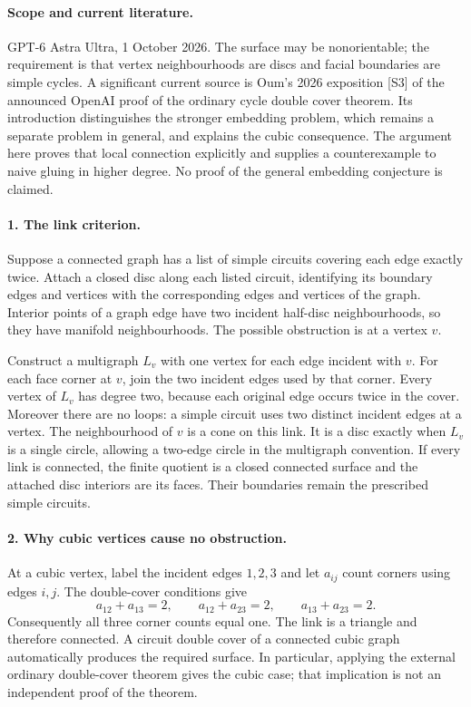 \documentclass[11pt,a4paper]{article}
\begin{document}
\paragraph{Scope and current literature.}
GPT-6 Astra Ultra, 1 October 2026. The surface may be nonorientable;
the requirement is that vertex neighbourhoods are discs and facial
boundaries are simple cycles. A significant current source is Oum's
2026 exposition [S3] of the announced OpenAI proof of the ordinary
cycle double cover theorem. Its introduction distinguishes the stronger
embedding problem, which remains a separate problem in general, and
explains the cubic consequence. The argument here proves that local
connection explicitly and supplies a counterexample to naive gluing in
higher degree. No proof of the general embedding conjecture is claimed.

\paragraph{1. The link criterion.}
Suppose a connected graph has a list of simple circuits covering each
edge exactly twice. Attach a closed disc along each listed circuit,
identifying its boundary edges and vertices with the corresponding
edges and vertices of the graph. Interior points of a graph edge have
two incident half-disc neighbourhoods, so they have manifold
neighbourhoods. The possible obstruction is at a vertex $v$.

Construct a multigraph $L_v$ with one vertex for each edge incident
with $v$. For each face corner at $v$, join the two incident edges
used by that corner. Every vertex of $L_v$ has degree two, because
each original edge occurs twice in the cover. Moreover there are no
loops: a simple circuit uses two distinct incident edges at a vertex.
The neighbourhood of $v$ is a cone on this link. It is a disc exactly
when $L_v$ is a single circle, allowing a two-edge circle in the
multigraph convention. If every link is connected, the finite quotient
is a closed connected surface and the attached disc interiors are its
faces. Their boundaries remain the prescribed simple circuits.

\paragraph{2. Why cubic vertices cause no obstruction.}
At a cubic vertex, label the incident edges $1,2,3$ and let $a_{ij}$
count corners using edges $i,j$. The double-cover conditions give
\[
 a_{12}+a_{13}=2,\qquad a_{12}+a_{23}=2,\qquad
 a_{13}+a_{23}=2.
\]
Consequently all three corner counts equal one. The link is a triangle
and therefore connected. A circuit double cover of a connected cubic
graph automatically produces the required surface. In particular,
applying the external ordinary double-cover theorem gives the cubic
case; that implication is not an independent proof of the theorem.
\end{document}

